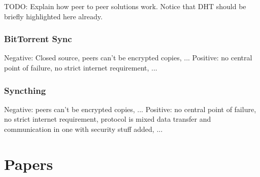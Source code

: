 TODO: Explain how peer to peer solutions work.
Notice that DHT should be briefly highlighted here already.

\subsubsection{BitTorrent Sync}

Negative: Closed source, peers can't be encrypted copies, ...
Positive: no central point of failure, no strict internet requirement, ...

\subsubsection{Syncthing}

Negative: peers can't be encrypted copies, ...
Positive: no central point of failure, no strict internet requirement, protocol is mixed data transfer and communication in one with security stuff added, ...

\section{Papers}

